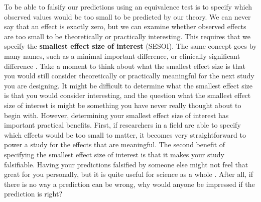 \documentclass[
  oneside]{krantz}
\begin{document}
To be able to falsify our predictions using an equivalence test is to specify which observed values would be too small to be predicted by our theory. We can never say that an effect is exactly zero, but we can examine whether observed effects are too small to be theoretically or practically interesting. This requires that we specify the \textbf{smallest effect size of interest} (SESOI). The same concept goes by many names, such as a minimal important difference, or clinically significant difference \citep{king_point_2011}. Take a moment to think about what the smallest effect size is that you would still consider theoretically or practically meaningful for the next study you are designing. It might be difficult to determine what the smallest effect size is that you would consider interesting, and the question what the smallest effect size of interest is might be something you have never really thought about to begin with. However, determining your smallest effect size of interest has important practical benefits. First, if researchers in a field are able to specify which effects would be too small to matter, it becomes very straightforward to power a study for the effects that are meaningful. The second benefit of specifying the smallest effect size of interest is that it makes your study falsifiable. Having your predictions falsified by someone else might not feel that great for you personally, but it is quite useful for science as a whole \citep{popper_logic_2002}. After all, if there is no way a prediction can be wrong, why would anyone be impressed if the prediction is right?
\end{document}
